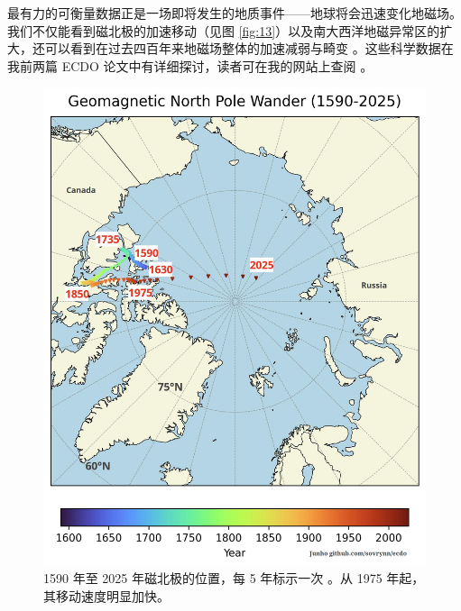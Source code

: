 \documentclass[10pt,twocolumn,letterpaper]{article}
\begin{document}
最有力的可衡量数据正是一场即将发生的地质事件——地球将会迅速变化地磁场。我们不仅能看到磁北极的加速移动（见图 \ref{fig:13}）以及南大西洋地磁异常区的扩大，还可以看到在过去四百年来地磁场整体的加速减弱与畸变 \cite{3}。这些科学数据在我前两篇 ECDO 论文中有详细探讨，读者可在我的网站上查阅 \cite{3}。


\begin{figure}[t]
\begin{center}
\includegraphics[width=1\linewidth]{npw.jpg}
\end{center}
\caption{1590 年至 2025 年磁北极的位置，每 5 年标示一次 \cite{41}。从 1975 年起，其移动速度明显加快。}
\label{fig:13}
\label{fig:onecol}
\end{figure}
\end{document}
